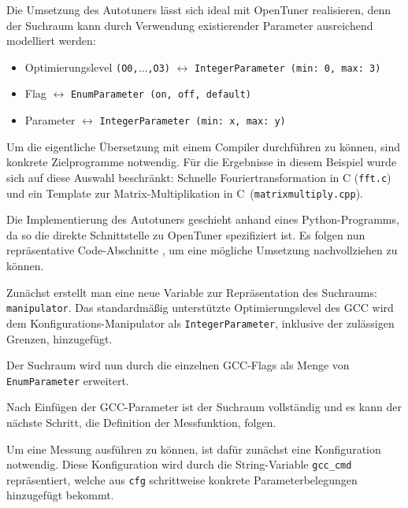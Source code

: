 \documentclass[a4paper,11pt]{scrartcl}
\def\CC{{C\nolinebreak[4]\hspace{-.05em}\raisebox{.4ex}{\tiny\bf ++}}}
\begin{document}
Die Umsetzung des Autotuners lässt sich ideal mit OpenTuner realisieren, denn der
Suchraum kann durch Verwendung existierender Parameter ausreichend modelliert werden:
\begin{itemize}
  \item Optimierungslevel \texttt{(O0,$\ldots$,O3)} $\leftrightarrow$ \texttt{IntegerParameter~(min:~0, max:~3)}
  \item Flag $\leftrightarrow$ \texttt{EnumParameter~(on,~off,~default)}
  \item Parameter $\leftrightarrow$ \texttt{IntegerParameter~(min:~x, max:~y)}
\end{itemize}
Um die eigentliche Übersetzung mit einem Compiler durchführen zu können, sind konkrete
Zielprogramme notwendig. Für die Ergebnisse in diesem Beispiel wurde sich auf diese
Auswahl beschränkt: Schnelle Fouriertransformation in C (\texttt{fft.c}) und 
ein Template zur Matrix-Multiplikation in \CC~(\texttt{matrixmultiply.cpp}). \newline

Die Implementierung des Autotuners geschieht anhand eines Python-Programms, da so die direkte Schnittstelle
zu OpenTuner spezifiziert ist. Es folgen nun repräsentative Code-Abschnitte \cite[S.~3]{OT-paper}, um eine
mögliche Umsetzung nachvollziehen zu können.  \newline


Zunächst erstellt man eine neue Variable zur Repräsentation des Suchraums: \texttt{manipulator}.
Das standardmäßig unterstützte Optimierungslevel des GCC wird dem Konfigurations-Manipulator
als \texttt{IntegerParameter}, inklusive der zulässigen Grenzen, hinzugefügt. \newline


Der Suchraum wird nun durch die einzelnen GCC-Flags als Menge von \texttt{EnumParameter} 
erweitert. \newline


Nach Einfügen der GCC-Parameter ist der Suchraum vollständig und es kann der nächste Schritt,
die Definition der Messfunktion, folgen. \newline


Um eine Messung ausführen zu können, ist dafür zunächst eine Konfiguration notwendig.
Diese Konfiguration wird durch die String-Variable \texttt{gcc\_cmd} repräsentiert, welche
aus \texttt{cfg} schrittweise konkrete Parameterbelegungen hinzugefügt bekommt. \newline
\end{document}
